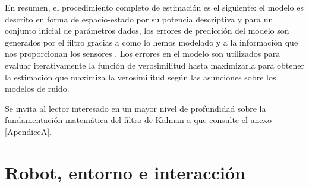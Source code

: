 En resumen, el procedimiento completo de estimación es el siguiente: el modelo es descrito en forma de espacio-estado por su potencia descriptiva y para un conjunto inicial de parámetros dados, los errores de predicción del modelo son generados por el filtro gracias a como lo hemos modelado y a la información que nos proporcionan los sensores \cite{RamseyArticle} \cite{KalmanEco}. 
%
%
%
Los errores en el modelo son utilizados para evaluar iterativamente la función de verosimilitud hasta maximizarla para obtener la estimación que maximiza la verosimilitud según las asunciones sobre los modelos de ruido.
%
%
%
%
%
%


%
%
%

Se invita al lector interesado en un mayor nivel de profundidad sobre la fundamentación matemática del filtro de Kalman a que consulte el anexo \ref{ApendiceA}.
%
%
%

\section{Robot, entorno e interacción}

